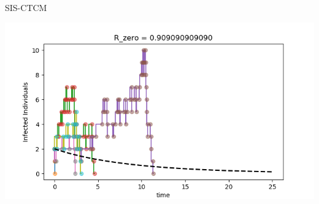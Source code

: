 \begin{frame}{SIS-CTCM}
    \begin{center}
    \includegraphics[width=\textwidth]{./homework/HW02.png}
    \end{center}
\end{frame}
